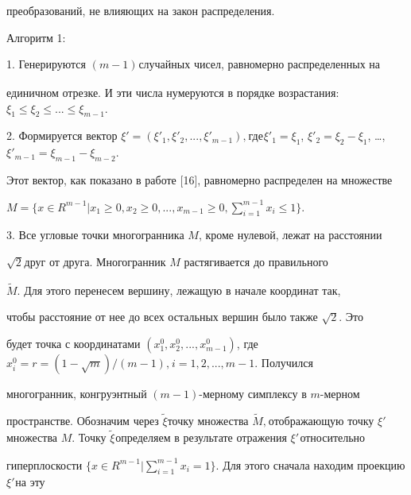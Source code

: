 \documentclass [12pt]{article}
\begin{document}
преобразований, не влияющих на закон распределения.



Алгоритм 1:



1. Генерируются $(m - 1)_{ }$случайных чисел, равномерно распределенных на 

единичном отрезке. И эти числа нумеруются в порядке возрастания: $\xi _1 \le 

\xi _2 \le ... \le \xi _{m - 1} $. 



2. Формируется вектор ${\xi }' = \left( {{\xi }'_1 ,{\xi }'_2 ,...,{\xi 

}'_{m - 1} } \right),_{ }$где$_{ }{\xi }'_1 = \xi _1 $, ${\xi }'_2 = \xi 

_2 - \xi _1 $, \ldots , ${\xi }'_{m - 1} = \xi _{m - 1} - \xi _{m - 2} $. 

Этот вектор, как показано в работе [16], равномерно распределен на множестве 

$M = \{x \in R^{m - 1}\vert x_1 \ge 0,x_2 \ge 0,...,x_{m - 1} \ge 

0,\sum\limits_{i = 1}^{m - 1} {x_i \le 1} \}$.



3. Все угловые точки многогранника $M$, кроме нулевой, лежат на расстоянии 

$\sqrt 2 _{ }$друг от друга. Многогранник $M$ растягивается до правильного 

$\tilde {M}$. Для этого перенесем вершину, лежащую в начале координат так, 

чтобы расстояние от нее до всех остальных вершин было также $\sqrt 2 $. Это 

будет точка с координатами $(x_1^0 ,x_2^0 ,...,x_{m - 1}^0 )$, где $x_i^0 = 

r = (1 - \sqrt m ) / (m - 1),_{ }i = 1,2,...,m - 1.$ Получился 

многогранник, конгруэнтный $(m - 1)$-мерному симплексу в $m$-мерном 

пространстве. Обозначим через $\tilde {\xi }$точку множества $\tilde 

{M},_{ }$отображающую точку ${\xi }'_ _{ }$множества $M$. Точку $\tilde 

{\xi }_{ }$определяем в результате отражения ${\xi }'_ _{ }$относительно 

гиперплоскости $\{x \in R^{m - 1}\vert \sum\limits_{i = 1}^{m - 1} {x_i = 1} 

\}$. Для этого сначала находим проекцию ${\xi }'_{ }$на эту 
\end{document}
